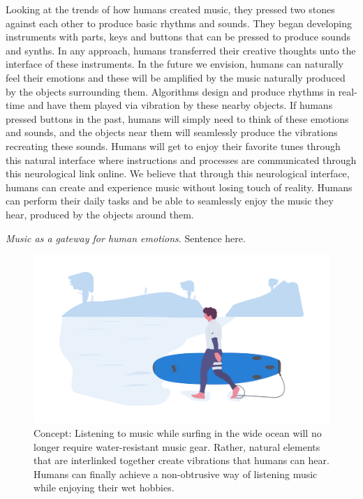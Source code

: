 \documentclass[acmtog]{acmart}
\begin{document}
Looking at the trends of how humans created music, they pressed two stones against each other to produce basic rhythms and sounds. They began developing instruments with parts, keys and buttons that can be pressed to produce sounds and synths. In any approach, humans transferred their creative thoughts unto the interface of these instruments. In the future we envision, humans can naturally feel their emotions and these will be amplified by the music naturally produced by the objects surrounding them. Algorithms design and produce rhythms in real-time and have them played via vibration by these nearby objects. If humans pressed buttons in the past, humans will simply need to think of these emotions and sounds, and the objects near them will seamlessly produce the vibrations recreating these sounds. Humans will get to enjoy their favorite tunes through this natural interface where instructions and processes are communicated through this neurological link online. We believe that through this neurological interface, humans can create and experience music without losing touch of reality. Humans can perform their daily tasks and be able to seamlessly enjoy the music they hear, produced by the objects around them. 

\textit{Music as a gateway for human emotions}. Sentence here. 
% 

\begin{figure}[h]
  \centering
  \includegraphics[width=\linewidth]{acmart-master-2/samples/surfer.png}
  \caption{Concept: Listening to music while surfing in the wide ocean will no longer require water-resistant music gear. Rather, natural elements that are interlinked together create vibrations that humans can hear. Humans can finally achieve a non-obtrusive way of listening music while enjoying their wet hobbies. }
\end{figure}
\end{document}
